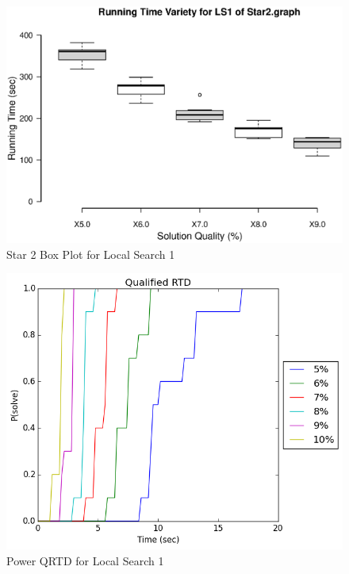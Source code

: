 \documentclass{sig-alternate-05-2015}
\begin{document}
\begin{figure}
\centering
\caption{Star 2 Box Plot for Local Search 1}
\includegraphics[scale=0.33]{Star2LS1_boxplot.eps}
\end{figure}

\begin{figure}
\centering
\caption{Power QRTD for Local Search 1}
\includegraphics[scale=0.4]{PowerLS1_qrtd_graph.png}
\end{figure}
\end{document}
